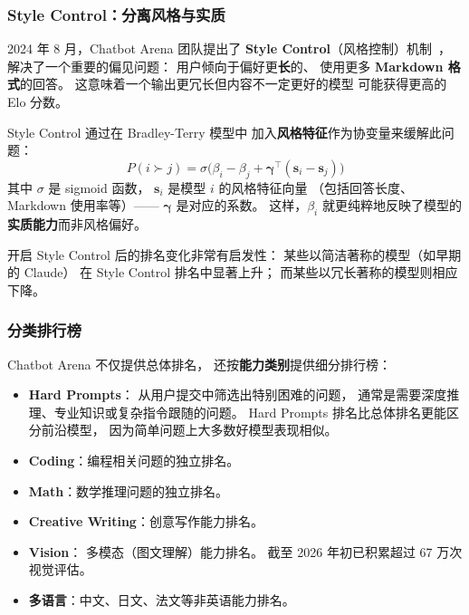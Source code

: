 \subsubsection{Style Control：分离风格与实质}

2024 年 8 月，Chatbot Arena 团队提出了
\textbf{Style Control}（风格控制）机制~\cite{li2024stylecontrol}，
解决了一个重要的偏见问题：
用户倾向于偏好更\textbf{长}的、
使用更多 \textbf{Markdown 格式}的回答。
这意味着一个输出更冗长但内容不一定更好的模型
可能获得更高的 Elo 分数。

Style Control 通过在 Bradley-Terry 模型中
加入\textbf{风格特征}作为协变量来缓解此问题：
\begin{equation}
  P(i \succ j) = \sigma\bigl(\beta_i - \beta_j
  + \boldsymbol{\gamma}^\top(\mathbf{s}_i - \mathbf{s}_j)\bigr)
  \label{eq:style-control}
\end{equation}
其中 $\sigma$ 是 sigmoid 函数，
$\mathbf{s}_i$ 是模型 $i$ 的风格特征向量
（包括回答长度、Markdown 使用率等）——
$\boldsymbol{\gamma}$ 是对应的系数。
这样，$\beta_i$ 就更纯粹地反映了模型的
\textbf{实质能力}而非风格偏好。

开启 Style Control 后的排名变化非常有启发性：
某些以简洁著称的模型（如早期的 Claude）
在 Style Control 排名中显著上升；
而某些以冗长著称的模型则相应下降。

\subsubsection{分类排行榜}

Chatbot Arena 不仅提供总体排名，
还按\textbf{能力类别}提供细分排行榜：
\begin{itemize}[noitemsep]
  \item \textbf{Hard Prompts}：
        从用户提交中筛选出特别困难的问题，
        通常是需要深度推理、专业知识或复杂指令跟随的问题。
        Hard Prompts 排名比总体排名更能区分前沿模型，
        因为简单问题上大多数好模型表现相似。
  \item \textbf{Coding}：编程相关问题的独立排名。
  \item \textbf{Math}：数学推理问题的独立排名。
  \item \textbf{Creative Writing}：创意写作能力排名。
  \item \textbf{Vision}：
        多模态（图文理解）能力排名。
        截至 2026 年初已积累超过 67 万次视觉评估。
  \item \textbf{多语言}：中文、日文、法文等非英语能力排名。
\end{itemize}

